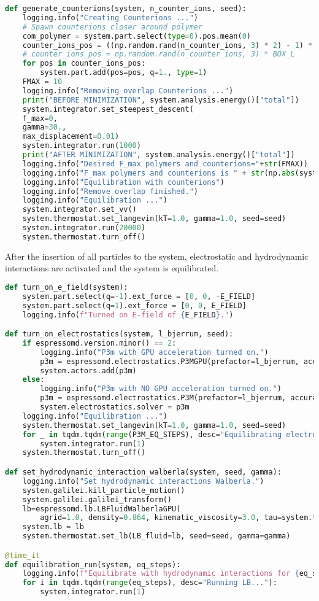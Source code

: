 \begin{lstlisting}[language=python]
def generate_counterions(system, n_counter_ions, seed):
	logging.info("Creating Counterions ...")
	# Spawn counterions closer around polymer
	com_polymer = system.part.select(type=0).pos.mean(0)
	counter_ions_pos = ((np.random.rand(n_counter_ions, 3) * 2) - 1) * BOX_L/ 2 + com_polymer
	# counter_ions_pos = np.random.rand(n_counter_ions, 3) * BOX_L
	for pos in counter_ions_pos:
		system.part.add(pos=pos, q=1., type=1)
	FMAX = 10
	logging.info("Removing overlap Counterions ...")
	print("BEFORE MINIMIZATION", system.analysis.energy()["total"])
	system.integrator.set_steepest_descent(
	f_max=0,
	gamma=30.,
	max_displacement=0.01)
	system.integrator.run(1000)
	print("AFTER MINIMIZATION", system.analysis.energy()["total"])
	logging.info("Desired F_max polymers and counterions="+str(FMAX))
	logging.info("F_max polymers and counterions is " + str(np.abs(system.part.all().f).max()))
	logging.info("Equilibration with counterions")
	logging.info("Remove overlap finished.")
	logging.info("Equilibration ...")
	system.integrator.set_vv()
	system.thermostat.set_langevin(kT=1.0, gamma=1.0, seed=seed)
	system.integrator.run(20000)
	system.thermostat.turn_off()
\end{lstlisting}		
After the insertion of all particles to the system, electrostatic and hydrodynamic interactions are activated and the system is equilibrated.
\begin{lstlisting}[language=python]
def turn_on_e_field(system):
	system.part.select(q=-1).ext_force = [0, 0, -E_FIELD]
	system.part.select(q=1).ext_force = [0, 0, E_FIELD]
	logging.info(f"Turned on E-field of {E_FIELD}.")

def turn_on_electrostatics(system, l_bjerrum, seed):
	if espressomd.version.minor() == 2:
		logging.info("P3m with GPU acceleration turned on.")
		p3m = espressomd.electrostatics.P3MGPU(prefactor=l_bjerrum, accuracy=0.0001)
		system.actors.add(p3m)
	else:
		logging.info("P3m with NO GPU acceleration turned on.")
		p3m = espressomd.electrostatics.P3M(prefactor=l_bjerrum, accuracy=0.0001)
		system.electrostatics.solver = p3m
	logging.info("Equilibration ...")
	system.thermostat.set_langevin(kT=1.0, gamma=1.0, seed=seed)
	for _ in tqdm.tqdm(range(P3M_EQ_STEPS), desc="Equilibrating electrostatics..."):
		system.integrator.run(1)
	system.thermostat.turn_off()

def set_hydrodynamic_interaction_walberla(system, seed, gamma):
	logging.info("Set hydrodynamic interactions Walberla.")
	system.galilei.kill_particle_motion()
	system.galilei.galilei_transform()
	lb=espressomd.lb.LBFluidWalberlaGPU(
		agrid=1.0, density=0.864, kinematic_viscosity=3.0, tau=system.time_step, kT=1, ext_force_density=[0.0,0.0,0.0], seed=seed)
	system.lb = lb
	system.thermostat.set_lb(LB_fluid=lb, seed=seed, gamma=gamma)

@time_it
def equilibration_run(system, eq_steps):
	logging.info(f"Equilibrate with hydrodynamic interactions for {eq_steps} steps.")
	for i in tqdm.tqdm(range(eq_steps), desc="Running LB..."):
		system.integrator.run(1)
\end{lstlisting}
